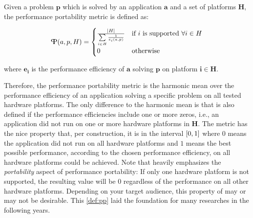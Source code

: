 \begin{definition}\label{def:pp}
    Given a problem $\mathbf{p}$ which is solved by an application $\mathbf{a}$ and a set of platforms $\mathbf{H}$, the performance portability metric \pp is defined as:

    \[ \pp(a, p, H) = 
        \begin{cases}
            \frac{\abs{H}}{\sum\limits_{i \in H} \frac{1}{e_i(a, p)}} & \text{if }i\text{ is supported } \forall i \in H \\
            0                                                         & \text{otherwise}
        \end{cases} 
    \]

    where $\mathbf{e_i}$ is the performance efficiency of $\mathbf{a}$ solving $\mathbf{p}$ on platform $\mathbf{i \in H}$.
\end{definition}
Therefore, the performance portability metric \pp is the harmonic mean over the performance efficiency of an application solving a specific problem on all tested hardware platforms. 
The only difference to the harmonic mean is that \pp is also defined if the performance efficiencies include one or more zeros, i.e., an application did not run on one or more hardware platforms in $\mathbf{H}$. 
The \pp metric has the nice property that, per construction, it is in the interval $\interval{0}{1}$ where $0$ means the application did not run on all hardware platforms and $1$ means the best possible performance, according to the chosen performance efficiency, on all hardware platforms could be achieved. 
Note that \pp heavily emphasizes the \textit{portability} aspect of performance portability: If only one hardware platform is not supported, the resulting \pp value will be $0$ regardless of the performance on all other hardware platforms. 
Depending on your target audience, this property of \pp may or may not be desirable. 
This \autoref{def:pp} laid the foundation for many researches in the following years.
